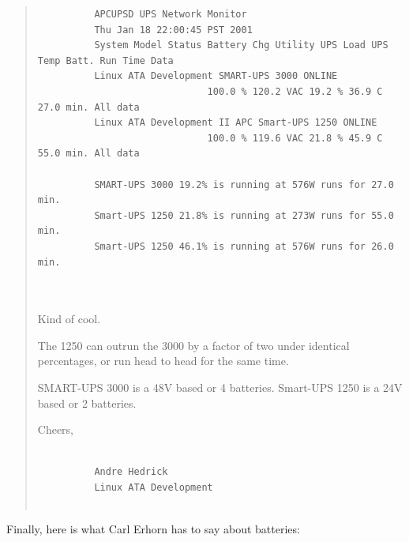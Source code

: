 \begin{quote}
\begin{verbatim}
          APCUPSD UPS Network Monitor
          Thu Jan 18 22:00:45 PST 2001
          System Model Status Battery Chg Utility UPS Load UPS Temp Batt. Run Time Data
          Linux ATA Development SMART-UPS 3000 ONLINE
                              100.0 % 120.2 VAC 19.2 % 36.9 C 27.0 min. All data
          Linux ATA Development II APC Smart-UPS 1250 ONLINE
                              100.0 % 119.6 VAC 21.8 % 45.9 C 55.0 min. All data
          
          SMART-UPS 3000 19.2% is running at 576W runs for 27.0 min.
          Smart-UPS 1250 21.8% is running at 273W runs for 55.0 min.
          Smart-UPS 1250 46.1% is running at 576W runs for 26.0 min.
          
     
\end{verbatim}
\normalsize

Kind of cool.  

The 1250 can outrun the 3000 by a factor of two under identical percentages,
or run head to head for the same time.  

SMART-UPS 3000 is a 48V based or 4 batteries.  Smart-UPS 1250 is a 24V based
or 2 batteries.  

Cheers,  

\footnotesize
\begin{verbatim}
          
          Andre Hedrick
          Linux ATA Development
     
\end{verbatim}
\normalsize

\end{quote}

Finally, here is what Carl Erhorn has to say about batteries:  

